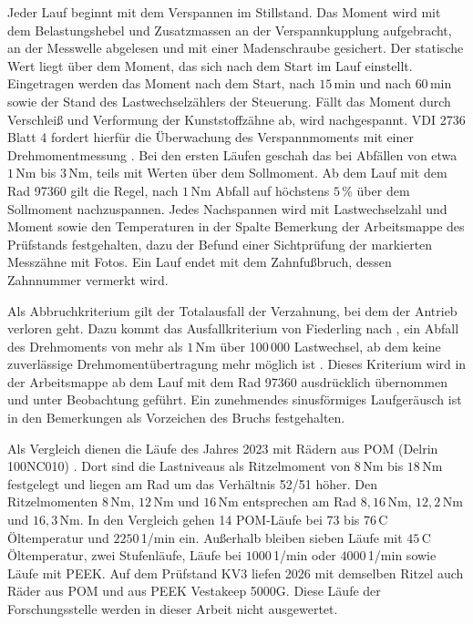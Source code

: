 Jeder Lauf beginnt mit dem Verspannen im Stillstand. Das Moment wird mit dem Belastungshebel und Zusatzmassen an der Verspannkupplung aufgebracht, an der Messwelle abgelesen und mit einer Madenschraube gesichert. Der statische Wert liegt über dem Moment, das sich nach dem Start im Lauf einstellt. Eingetragen werden das Moment nach dem Start, nach $15$\,min und nach $60$\,min sowie der Stand des Lastwechselzählers der Steuerung. Fällt das Moment durch Verschleiß und Verformung der Kunststoffzähne ab, wird nachgespannt. VDI 2736 Blatt 4 fordert hierfür die Überwachung des Verspannmoments mit einer Drehmomentmessung \cite[S.~11]{VDI2736-4}. Bei den ersten Läufen geschah das bei Abfällen von etwa $1$\,Nm bis $3$\,Nm, teils mit Werten über dem Sollmoment. Ab dem Lauf mit dem Rad 97360 gilt die Regel, nach $1$\,Nm Abfall auf höchstens $5$\,\% über dem Sollmoment nachzuspannen. Jedes Nachspannen wird mit Lastwechselzahl und Moment sowie den Temperaturen in der Spalte Bemerkung der Arbeitsmappe des Prüfstands festgehalten, dazu der Befund einer Sichtprüfung der markierten Messzähne mit Fotos. Ein Lauf endet mit dem Zahnfußbruch, dessen Zahnnummer vermerkt wird.

Als Abbruchkriterium gilt der Totalausfall der Verzahnung, bei dem der Antrieb verloren geht. Dazu kommt das Ausfallkriterium von Fiederling nach , ein Abfall des Drehmoments von mehr als $1$\,Nm über 100\,000 Lastwechsel, ab dem keine zuverlässige Drehmomentübertragung mehr möglich ist \cite[S.~65]{Fie23}. Dieses Kriterium wird in der Arbeitsmappe ab dem Lauf mit dem Rad 97360 ausdrücklich übernommen und unter Beobachtung geführt. Ein zunehmendes sinusförmiges Laufgeräusch ist in den Bemerkungen als Vorzeichen des Bruchs festgehalten.

Als Vergleich dienen die Läufe des Jahres 2023 mit Rädern aus POM (Delrin 100NC010) \cite[S.~43 und 65]{Fie23}. Dort sind die Lastniveaus als Ritzelmoment von $8$\,Nm bis $18$\,Nm festgelegt und liegen am Rad um das Verhältnis 52/51 höher. Den Ritzelmomenten $8$\,Nm, $12$\,Nm und $16$\,Nm entsprechen am Rad $8{,}16$\,Nm, $12{,}2$\,Nm und $16{,}3$\,Nm. In den Vergleich gehen 14 POM-Läufe bei $73$ bis $76$\,\textdegree C Öltemperatur und $2250$\,1/min ein. Außerhalb bleiben sieben Läufe mit $45$\,\textdegree C Öltemperatur, zwei Stufenläufe, Läufe bei $1000$\,1/min oder $4000$\,1/min sowie Läufe mit PEEK. Auf dem Prüfstand KV3 liefen 2026 mit demselben Ritzel auch Räder aus POM und aus PEEK Vestakeep 5000G. Diese Läufe der Forschungsstelle werden in dieser Arbeit nicht ausgewertet.

